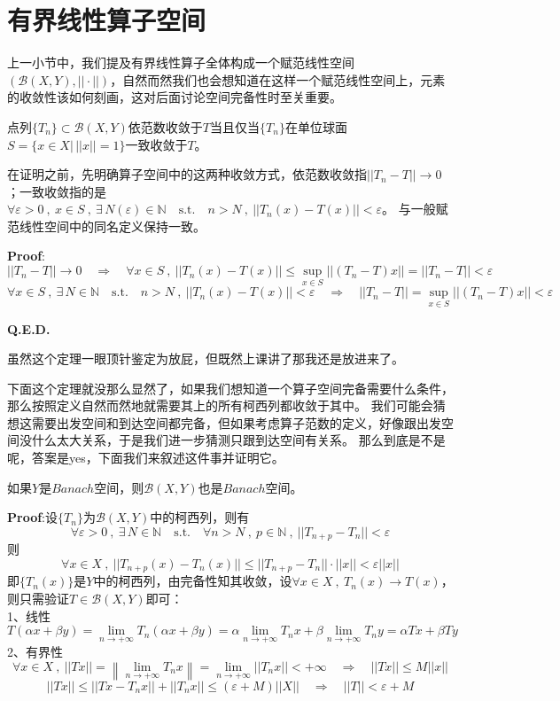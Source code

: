 \section{有界线性算子空间}
上一小节中，我们提及有界线性算子全体构成一个赋范线性空间$(\mathscr{B}(X,Y),||\cdot||)$，自然而然我们也会想知道在这样一个赋范线性空间上，元素的收敛性该如何刻画，这对后面讨论空间完备性时至关重要。
\begin{theorem}
    点列$\{T_n\} \subset \mathscr{B}(X,Y)$依范数收敛于$T$当且仅当$\{T_n\}$在单位球面$S=\{x \in X| \, ||x||=1\}$一致收敛于$T$。
\end{theorem} 
在证明之前，先明确算子空间中的这两种收敛方式，依范数收敛指$||T_n-T|| \to 0$；一致收敛指的是$\forall \varepsilon>0 \ , \ x \in S \ , \ \exists \, N(\varepsilon) \in \mathbb{N} \quad \text{s.t.} \quad n>N \ , \ ||T_n(x)-T(x)||<\varepsilon$。
与一般赋范线性空间中的同名定义保持一致。

\textbf{Proof}:
\[||T_n-T|| \to 0 \quad \Rightarrow \quad \forall x \in S \ , \ ||T_n(x)-T(x)|| \leq \mathop \text{sup}\limits_{x \in S}||(T_n-T)x||=||T_n-T||<\varepsilon\]
\[\forall x \in S \ , \ \exists \, N \in \mathbb{N} \quad \text{s.t.} \quad n>N \ , \ ||T_n(x)-T(x)||<\varepsilon \quad \Rightarrow \quad ||T_n-T||=\mathop \text{sup}\limits_{x \in S}||(T_n-T)x||<\varepsilon\]

\textbf{Q.E.D.}

虽然这个定理一眼顶针鉴定为放屁，但既然上课讲了那我还是放进来了。

下面这个定理就没那么显然了，如果我们想知道一个算子空间完备需要什么条件，那么按照定义自然而然地就需要其上的所有柯西列都收敛于其中。
我们可能会猜想这需要出发空间和到达空间都完备，但如果考虑算子范数的定义，好像跟出发空间没什么太大关系，于是我们进一步猜测只跟到达空间有关系。
那么到底是不是呢，答案是yes，下面我们来叙述这件事并证明它。
\begin{theorem}
    如果$Y$是$Banach$空间，则$\mathscr{B}(X,Y)$也是$Banach$空间。
\end{theorem} 
\textbf{Proof}:设$\{T_n\}$为$\mathscr{B}(X,Y)$中的柯西列，则有
\[\forall \varepsilon>0 \ , \ \exists \, N \in \mathbb{N} \quad \text{s.t.} \quad \forall n>N \ , \ p \in \mathbb{N} \ , \ ||T_{n+p}-T_n||<\varepsilon\]
则
\[\forall x \in X \ , \ ||T_{n+p}(x)-T_n(x)|| \leq ||T_{n+p}-T_n|| \cdot ||x||<\varepsilon||x||\]
即$\{T_n(x)\}$是$Y$中的柯西列，由完备性知其收敛，设$\forall x \in X \ , \ T_n(x) \to T(x)$，则只需验证$T \in \mathscr{B}(X,Y)$即可：\\
1、线性
\[T(\alpha x+\beta y)=\lim_{n \to +\infty}T_n(\alpha x+\beta y)=\alpha\lim_{n \to +\infty}T_nx+\beta\lim_{n \to +\infty}T_ny=\alpha Tx+\beta Ty\]
2、有界性
\[\forall x \in X \ , \ ||Tx||=\left\|\lim_{n \to +\infty}T_nx\right\|=\lim_{n \to +\infty}||T_nx||<+\infty \quad \Rightarrow \quad ||Tx|| \leq M||x||\]
\[||Tx|| \leq ||Tx-T_nx||+||T_nx|| \leq (\varepsilon+M)||X|| \quad \Rightarrow \quad ||T||<\varepsilon+M\]

